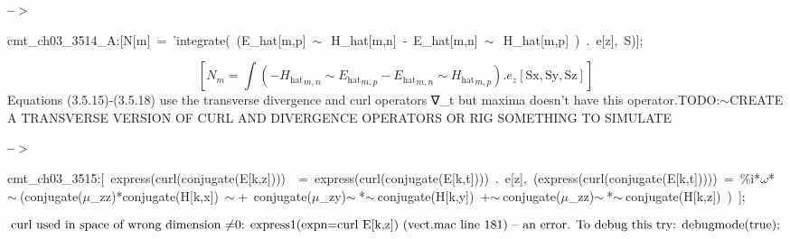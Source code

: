 \documentclass[fleqn]{article}
\begin{document}
\noindent
\begin{minipage}[t]{4.000000em}\color{red}\bfseries
 --\ensuremath{\ensuremath{>}}	
\end{minipage}
\begin{minipage}[t]{\textwidth}\color{blue}
cmt\_ch03\_3514\_A:[N[m]\ =\ 'integrate(\ (E\_hat[m,p]\ \ensuremath{\sim\ }\ H\_hat[m,n]\ -\ E\_hat[m,n]\ \ensuremath{\sim\ }\ H\_hat[m,p]\ )\ .\ e[z],\ S)];
\end{minipage}
\[\displaystyle \tag{cmt\_ ch03\_ 3514\_ A} 
\left[ {N_m}=\int {\left. \left( -{{{H_{\ensuremath{\mathrm{hat}}}}}_{m,n}}\operatorname{\sim  }{{{E_{\ensuremath{\mathrm{hat}}}}}_{m,p}}-{{{E_{\ensuremath{\mathrm{hat}}}}}_{m,n}}\operatorname{\sim  }{{{H_{\ensuremath{\mathrm{hat}}}}}_{m,p}}\right) \ensuremath{\mathrm{ . }}{e_z}\left[ \ensuremath{\mathrm{Sx}}\operatorname{,}\ensuremath{\mathrm{Sy}}\operatorname{,}\ensuremath{\mathrm{Sz}}\right] \right.}\right] \mbox{}
\]
Equations (3.5.15)-(3.5.18) use the transverse divergence and curl operators ∇\_t but maxima doesn't have this operator.TODO:\ensuremath{\sim }CREATE A TRANSVERSE VERSION OF CURL AND DIVERGENCE OPERATORS OR RIG SOMETHING TO SIMULATE


\noindent
\begin{minipage}[t]{4.000000em}\color{red}\bfseries
 --\ensuremath{\ensuremath{>}}	
\end{minipage}
\begin{minipage}[t]{\textwidth}\color{blue}
cmt\_ch03\_3515:[\ express(curl(conjugate(E[k,z])))\ \ =\ express(curl(conjugate(E[k,t])))\ .\ e[z],\ (express(curl(conjugate(E[k,t]))))\ =\ \%i*\ensuremath{\omega}*\ensuremath{\sim\ }(conjugate(\ensuremath{\mu}\_zz)*conjugate(H[k,x])\ \ensuremath{\sim\ }+\ conjugate(\ensuremath{\mu}\_zy)\ensuremath{\sim\ }*\ensuremath{\sim\ }conjugate(H[k,y])\ +\ensuremath{\sim\ }conjugate(\ensuremath{\mu}\_zz)\ensuremath{\sim\ }*\ensuremath{\sim\ }conjugate(H[k,z])\ )\ ];
\end{minipage}
\[\displaystyle \mbox{%
curl used in space of wrong dimension
}\mbox{%
\ensuremath{\neq}0: express1(expn=curl E[k,z]) (vect.mac line 181)
}\mbox{%
 -- an error. To debug this try: debugmode(true);}\mbox{}
\]
\end{document}
